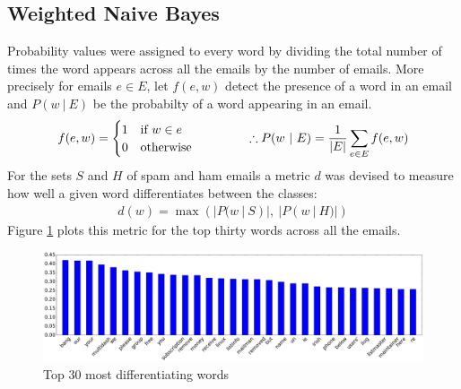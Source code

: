 \documentclass[12pt, a4paper]{article}
\begin{document}
	\begin{minipage}{\linewidth}
  \subsection{Weighted Naive Bayes}

  Probability values were assigned to every word by dividing the total number of times the word appears across all the emails by the number of emails. More precisely for emails $e \in E$, let $f(e, w)$ detect the presence of a word in an email and $P(w\ |\ E)$ be the probabilty of a word appearing in an email.
  \vspace{-0.1cm}
  \begin{align*}
    f(e, w) = \begin{cases}
      1   & \text{if } w \in e \\
      0   & \text{otherwise}
    \end{cases}
		\hspace{1.5cm}
    \therefore P(w\ |\ E) = \frac{1}{|E|}\sum_{e \in E}{f(e, w)}
  \end{align*}
  For the sets $S$ and $H$ of spam and ham emails a metric $d$ was devised to measure how well a given word differentiates between the classes:
  \vspace{-0.1cm}
  \begin{align*}
    d(w) = \max(|P(w\ |\ S)|,\ |P(w\ |\ H)|)
  \end{align*}
  Figure \ref{wordprobsham} plots this metric for the top thirty words across all the emails.

  \begin{figure}[H]
    \caption{Top 30 most differentiating words}
    \label{wordprobsham}
    \vspace{-0.2cm}
    \centering
    \includegraphics[width=1\linewidth]{report_images/word_probs_diff}
  \end{figure}


\end{minipage}
\end{document}
